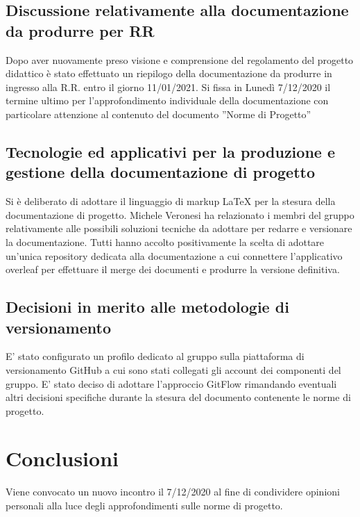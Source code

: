 \subsection{Discussione relativamente alla documentazione da produrre per RR}
Dopo aver nuovamente preso visione e comprensione del regolamento del progetto didattico è stato effettuato un riepilogo della documentazione da produrre in ingresso alla R.R. entro il giorno 11/01/2021. Si fissa in Lunedì 7/12/2020 il termine ultimo per l’approfondimento individuale della documentazione con particolare attenzione al contenuto del documento ”Norme di Progetto”

\subsection{Tecnologie ed applicativi per la produzione e gestione della documentazione di progetto}

Si è deliberato di adottare il linguaggio di markup LaTeX per la stesura della documentazione di progetto. Michele Veronesi ha relazionato i membri del gruppo relativamente alle possibili soluzioni tecniche da adottare per redarre e versionare la documentazione. Tutti hanno accolto positivamente la scelta di adottare un’unica repository dedicata alla documentazione a cui connettere l’applicativo overleaf per effettuare il merge dei documenti e produrre la versione definitiva.

\subsection{Decisioni in merito alle metodologie di versionamento}
E’ stato configurato un profilo dedicato al gruppo sulla piattaforma di versionamento GitHub a cui sono stati collegati gli account dei componenti del gruppo. E’ stato deciso di adottare l’approccio GitFlow rimandando eventuali altri decisioni specifiche durante la stesura del documento contenente le norme di progetto.


\section{Conclusioni}
Viene convocato un nuovo incontro il 7/12/2020 al fine di condividere opinioni personali alla luce degli approfondimenti sulle norme di progetto.